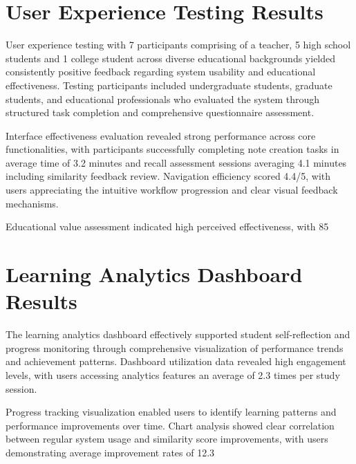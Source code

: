{\section{User Experience Testing Results}

{\color{maroon}
User experience testing with 7 participants comprising of a teacher, 5 high school students and 1 college student across diverse educational backgrounds yielded consistently positive feedback regarding system usability and educational effectiveness. Testing participants included undergraduate students, graduate students, and educational professionals who evaluated the system through structured task completion and comprehensive questionnaire assessment.

Interface effectiveness evaluation revealed strong performance across core functionalities, with participants successfully completing note creation tasks in average time of 3.2 minutes and recall assessment sessions averaging 4.1 minutes including similarity feedback review. Navigation efficiency scored 4.4/5, with users appreciating the intuitive workflow progression and clear visual feedback mechanisms.

Educational value assessment indicated high perceived effectiveness, with 85%
}

\section{Learning Analytics Dashboard Results}

{\color{maroon}
The learning analytics dashboard effectively supported student self-reflection and progress monitoring through comprehensive visualization of performance trends and achievement patterns. Dashboard utilization data revealed high engagement levels, with users accessing analytics features an average of 2.3 times per study session.

Progress tracking visualization enabled users to identify learning patterns and performance improvements over time. Chart analysis showed clear correlation between regular system usage and similarity score improvements, with users demonstrating average improvement rates of 12.3%

}}
